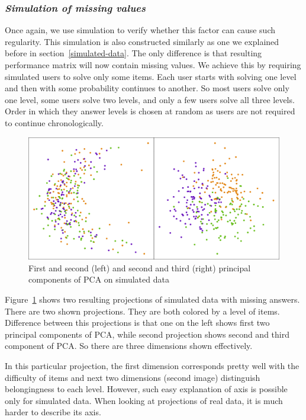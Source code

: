 \documentclass[
  print, %
  table,   %
  nolof,     %
  nolot,     %
  nocover,
  color,
  final,
]{fithesis3}
\begin{document}

\subsubsection{\textit{Simulation of missing values}}\label{simulation-of-missing-values}

Once again, we use simulation to verify whether this factor can cause such regularity. This simulation is also constructed similarly as one we explained before in section~\ref{simulated-data}. The only difference is that resulting performance matrix will now contain missing values. We achieve this by requiring simulated users to solve only some items. Each user starts with solving one level and then with some probability continues to another. So most users solve only one level, some users solve two levels, and only a few users solve all three levels. Order in which they answer levels is chosen at random as users are not required to continue chronologically.

\begin{figure}
  \includegraphics[width=\textwidth]{img/simulated_missing}
  \caption{First and second (left) and second and third (right) principal components of PCA on simulated data}
  \label{fig:simulated_missing}
\end{figure}

Figure~\ref{fig:simulated_missing} shows two resulting projections of simulated data with missing answers. There are two shown projections. They are both colored by a level of items. Difference between this projections is that one on the left shows first two principal components of PCA, while second projection shows second and third component of PCA. So there are three dimensions shown effectively.

In this particular projection, the first dimension corresponds pretty well with the difficulty of items and next two dimensions (second image) distinguish belongingness to each level. However, such easy explanation of axis is possible only for simulated data. When looking at projections of real data, it is much harder to describe its axis.
\end{document}
